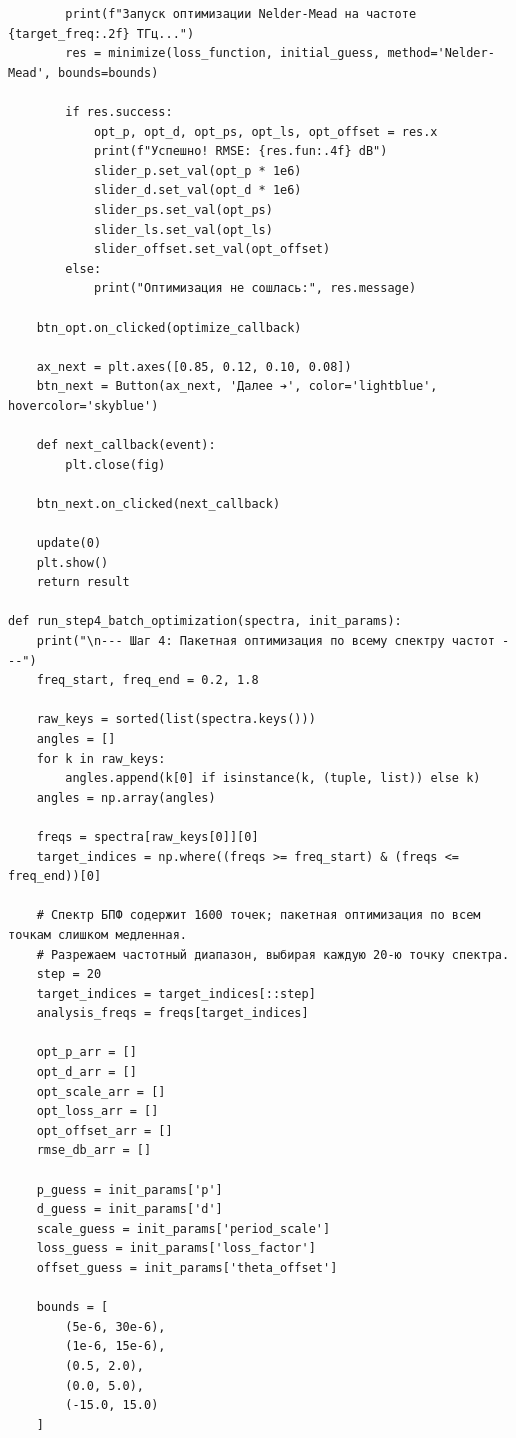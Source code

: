 \begin{verbatim}
        print(f"Запуск оптимизации Nelder-Mead на частоте {target_freq:.2f} ТГц...")
        res = minimize(loss_function, initial_guess, method='Nelder-Mead', bounds=bounds)
        
        if res.success:
            opt_p, opt_d, opt_ps, opt_ls, opt_offset = res.x
            print(f"Успешно! RMSE: {res.fun:.4f} dB")
            slider_p.set_val(opt_p * 1e6)
            slider_d.set_val(opt_d * 1e6)
            slider_ps.set_val(opt_ps)
            slider_ls.set_val(opt_ls)
            slider_offset.set_val(opt_offset)
        else:
            print("Оптимизация не сошлась:", res.message)
            
    btn_opt.on_clicked(optimize_callback)
    
    ax_next = plt.axes([0.85, 0.12, 0.10, 0.08])
    btn_next = Button(ax_next, 'Далее ➔', color='lightblue', hovercolor='skyblue')
    
    def next_callback(event):
        plt.close(fig)
        
    btn_next.on_clicked(next_callback)
    
    update(0)
    plt.show()
    return result

def run_step4_batch_optimization(spectra, init_params):
    print("\n--- Шаг 4: Пакетная оптимизация по всему спектру частот ---")
    freq_start, freq_end = 0.2, 1.8
    
    raw_keys = sorted(list(spectra.keys()))
    angles = []
    for k in raw_keys:
        angles.append(k[0] if isinstance(k, (tuple, list)) else k)
    angles = np.array(angles)
    
    freqs = spectra[raw_keys[0]][0]
    target_indices = np.where((freqs >= freq_start) & (freqs <= freq_end))[0]
    
    # Спектр БПФ содержит 1600 точек; пакетная оптимизация по всем точкам слишком медленная.
    # Разрежаем частотный диапазон, выбирая каждую 20-ю точку спектра.
    step = 20
    target_indices = target_indices[::step]
    analysis_freqs = freqs[target_indices]
    
    opt_p_arr = []
    opt_d_arr = []
    opt_scale_arr = []
    opt_loss_arr = []
    opt_offset_arr = []
    rmse_db_arr = []
    
    p_guess = init_params['p']
    d_guess = init_params['d']
    scale_guess = init_params['period_scale']
    loss_guess = init_params['loss_factor']
    offset_guess = init_params['theta_offset']
    
    bounds = [
        (5e-6, 30e-6),
        (1e-6, 15e-6),
        (0.5, 2.0),
        (0.0, 5.0),
        (-15.0, 15.0)
    ]
    

\end{verbatim}
